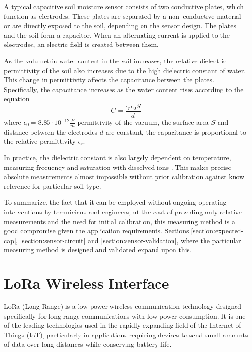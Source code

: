 A typical capacitive soil moisture sensor consists of two conductive plates, which function as electrodes. These plates are separated by a non--conductive material or are directly exposed to the soil, depending on the sensor design. The plates and the soil form a capacitor. When an alternating current is applied to the electrodes, an electric field is created between them.

As the volumetric water content in the soil increases, the relative dielectric permittivity of the soil also increases due to the high dielectric constant of water. This change in permittivity affects the capacitance between the plates. Specifically, the capacitance increases as the water content rises according to the equation
\begin{equation}
    \label{equation:capacitance} C = \dfrac{\epsilon_r \epsilon_0 S}{d}
\end{equation}
where $\epsilon_0 = 8.85 \cdot 10^{-12} \frac{F}{m}$ permittivity of the vacuum, the surface area $S$ and distance between the electrodes $d$ are constant, the capacitance is proportional to the relative permittivity $\epsilon_r$.

In practice, the dielectric constant is also largely dependent on temperature, measuring frequency and saturation with dissolved ions \cite{meter_group_soil_2023,podest_applications_nodate}. This makes precise absolute measurements almost impossible without prior calibration against know reference for particular soil type.

To summarize, the fact that it can be employed without ongoing operating interventions by technicians and engineers, at the cost of providing only relative measurements and the need for initial calibration, this measuring method is a good compromise given the application requirements. Sections \ref{section:expected-cap}, \ref{section:sensor-circuit} and \ref{section:sensor-validation}, where the particular measuring method is designed and validated expand upon this.

\section{LoRa Wireless Interface}
LoRa (Long Range) is a low-power wireless communication technology designed specifically for long-range communications with low power consumption. It is one of the leading technologies used in the rapidly expanding field of the Internet of Things (IoT), particularly in applications requiring devices to send small amounts of data over long distances while conserving battery life.

